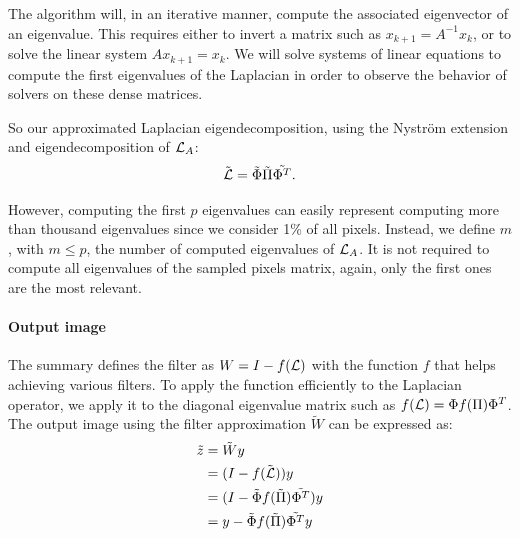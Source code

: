 The algorithm will, in an iterative manner, compute the associated eigenvector of an eigenvalue.
This requires either to invert a matrix such as \(x_{k+1} = A^{-1} x_k\), or to solve the linear system \(A x_{k+1} = x_k\).
We will solve systems of linear equations to compute the first eigenvalues of the Laplacian in order to observe the behavior of solvers on these dense matrices.

So our approximated Laplacian eigendecomposition, using the Nystr\"om extension and eigendecomposition of \(\operatorname{\mathcal{L}}_A\):
\[\tilde{\operatorname{\mathcal{L}}} = \tilde{\Phi} \tilde{\Pi} \tilde{\Phi^T}.\]

However, computing the first \(p\) eigenvalues can easily represent computing more than thousand eigenvalues since we consider 1\% of all pixels.
Instead, we define \(m\), with \(m \le p\), the number of computed eigenvalues of \(\operatorname{\mathcal{L}}_A\).
It is not required to compute all eigenvalues of the sampled pixels matrix, again, only the first ones are the most relevant.

\paragraph{Output image}
The summary \cite{modern_tour_2013} defines the filter as \(W = I - f(\operatorname{\mathcal{L}})\) with the function \(f\) that helps achieving various filters.
To apply the function efficiently to the Laplacian operator, we apply it to the diagonal eigenvalue matrix such as \(f(\operatorname{\mathcal{L}}) = \Phi f(\Pi) \Phi^T\).
The output image using the filter approximation \(\tilde{W}\) can be expressed as:
\begin{equation}
 \begin{split}
     \tilde{z} & = \tilde{W}y \\
               & = (I - f(\tilde{\operatorname{\mathcal{L}}})) y \\
               & = (I - \tilde{\Phi} f(\tilde{\Pi}) \tilde{\Phi^T}) y \\
               & = y - \tilde{\Phi} f(\tilde{\Pi}) \tilde{\Phi^T} y
 \end{split}
\end{equation}

